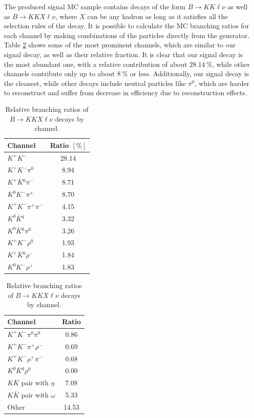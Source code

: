 The produced signal MC sample contains decays of the form $B \to KK\ell \nu$ as well as $B \to KKX\ell \nu$, where $X$ can be any hadron as long as it satisfies all the selection rules of the decay. It is possible to calculate the MC branching ratios for each channel by making combinations of the particles directly from the generator. Table \ref{tab:KKX} shows some of the most prominent channels, which are similar to our signal decay, as well as their relative fraction. It is clear that our signal decay is the most abundant one, with a relative contribution of about $28.14~\%$, while other channels contribute only up to about $8~\%$ or less. Additionally, our signal decay is the cleanest, while other decays include neutral particles like $\pi^0$, which are harder to reconstruct and suffer from decrease in efficiency due to reconstruction effects.
\begin{table}[H]
\centering
\begin{tabular}{|l|c|}
\hline
Channel & Ratio $[\%]$ \\
\hline 
$K^+ K^-$ & 28.14 \\
\hline
$K^+ K^- \pi^0$ & 8.94 \\
\hline
$K^+ \bar{K}{}^0 \pi^-$ & 8.71 \\
\hline
$K^0 K^- \pi^+$ & 8.70 \\
\hline
$K^+ K^- \pi^+ \pi^-$ & 4.15 \\
\hline
$K^0 \bar K {}^0$ & 3.32 \\
\hline
$K^0 \bar K {}^0 \pi^0$ & 3.26 \\
\hline
$K^+ K^- \rho^0$ & 1.93 \\
\hline
$K^+ \bar{K}{}^0 \rho^-$ & 1.84 \\
\hline
$K^0 K^- \rho^+$ & 1.83 \\
\hline
\end{tabular}
\begin{tabular}{|l|c|}
\hline
Channel & Ratio \\
\hline 
$K^+ K^- \pi^0 \pi^0$ & 0.86 \\
\hline
$K^+ K^- \pi^+ \rho^-$ & 0.69 \\
\hline
$K^+ K^- \rho^+ \pi^-$ & 0.68 \\
\hline
$K^0 \bar K {}^0 \rho^0$ & 0.00 \\
\hline
\hline
$K \bar K$ pair with $\eta$ & 7.08 \\
\hline
$K \bar K$ pair with $\omega$ & 5.33 \\
\hline
Other & 14.53 \\
\hline
\end{tabular}
\caption{Relative branching ratios of $B \to KKX\ell \nu$ decays by channel.}
\label{tab:KKX}
\end{table}

